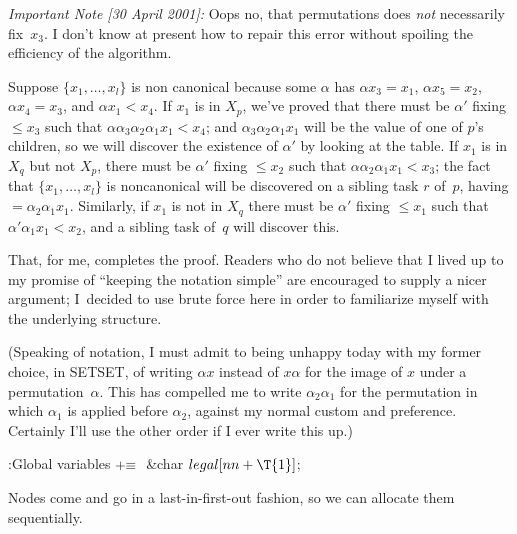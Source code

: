 {\sl Important Note [30 April 2001]:\/} Oops no, that permutations does
{\it not\/} necessarily fix~$x_3$. I don't know at present how to repair this
error without spoiling the efficiency of the algorithm.

Suppose $\{x_1,\ldots,x_l\}$ is non canonical because some $\alpha$ has
$\alpha x_3=x_1$, $\alpha x_5=x_2$, $\alpha x_4=x_3$, and $\alpha x_1<x_4$.
If $x_1$ is in $X_p$, we've proved that there must be $\alpha'$ fixing $\le
x_3$ such that $\alpha\alpha_3\alpha_2\alpha_1x_1<x_4$; and
$\alpha_3\alpha_2\alpha_1x_1$ will be the value of one of $p$'s children, so
we will discover the existence of $\alpha'$ by looking at the 
table.
If $x_1$ is in $X_q$ but not $X_p$, there must be $\alpha'$ fixing $\le x_2$
such that $\alpha\alpha_2\alpha_1x_1<x_3$; the fact that $\{x_1,\ldots,x_l\}$
is noncanonical will be discovered on a sibling task $r$ of~$p$, having
${}=\alpha_2\alpha_1x_1$. Similarly, if $x_1$ is not in
$X_q$ there
must be $\alpha'$ fixing $\le x_1$ such that $\alpha'\alpha_1x_1<x_2$, and
a sibling task of~$q$ will discover this.

That, for me, completes the proof.
Readers who do not believe that I lived up to my
promise of ``keeping the notation simple'' are encouraged to supply a nicer
argument; I~decided to use brute force here in order to familiarize myself with
the underlying structure.

(Speaking of notation, I must admit to being unhappy today with my former
choice, in
{\mc SETSET}, of writing $\alpha x$ instead of $x\alpha$ for the image of
$x$ under a permutation~$\alpha$. This has compelled me to write
$\alpha_2\alpha_1$
for the permutation in which $\alpha_1$ is applied before $\alpha_2$,
against my normal custom and preference. Certainly I'll use the other
order if I ever write this up.)

\Y\B\4:Global variables\X${}\mathrel+\equiv{}$\6
\&{char} ${}\\{legal}[\\{nn}+\T{1}]{}$;\par
\fi

Nodes come and go in a last-in-first-out fashion, so we can allocate them
sequentially.

